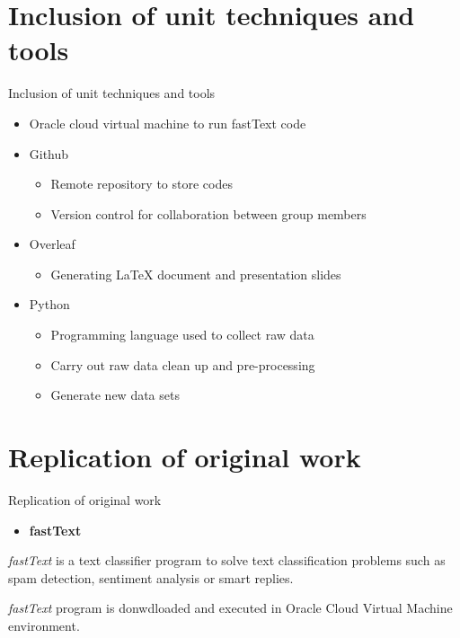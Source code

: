 \documentclass[10pt,xcolor={table,dvipsnames},t]{beamer}
\begin{document}
\section{Inclusion of unit techniques and tools}
\begin{frame}{Inclusion of unit techniques and tools}

\begin{itemize}
  \item Oracle cloud virtual machine to run fastText code
  \item Github
    \begin{itemize}
        \item Remote repository to store codes
        \item Version control for collaboration between group members
    \end{itemize}
  \item Overleaf
    \begin{itemize}
        \item Generating LaTeX document and presentation slides
    \end{itemize}
  \item Python
    \begin{itemize}
        \item Programming language used to collect raw data
        \item Carry out raw data clean up and pre-processing
        \item Generate new data sets
    \end{itemize}
\end{itemize}

\end{frame}
\section{Replication of original work}
\begin{frame}{Replication of original work}

    \begin{itemize}
        \item \textbf{fastText}
    \end{itemize}
    
    \textit{fastText} is a text classifier program to solve text classification problems such as spam detection, sentiment analysis or smart replies. \newline
    
    \textit{fastText} program is donwdloaded and executed in Oracle Cloud Virtual Machine environment. \newline

\end{frame}
\end{document}
